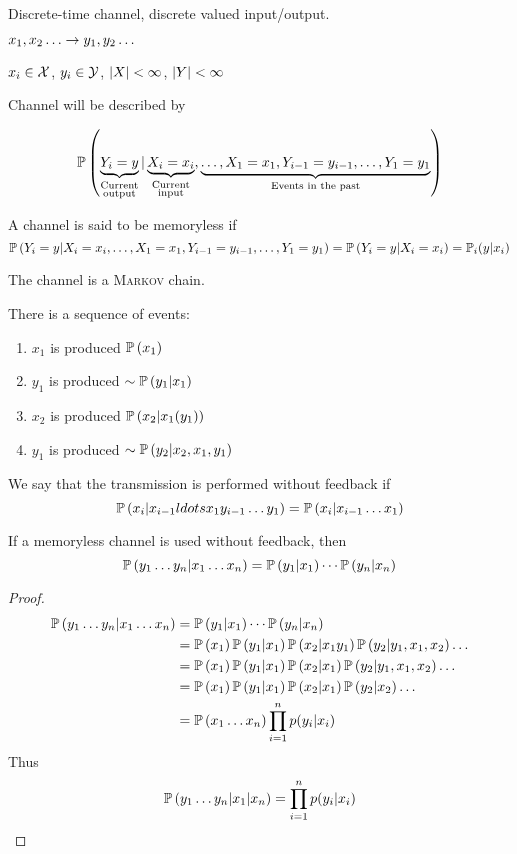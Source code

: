 Discrete-time channel, discrete valued input/output.

$x_1,x_2\ldots \rightarrow y_1, y_2\ldots$

$x_i \in \mathcal{X}$, $y_i \in \mathcal{Y}$, $\left\lvert X\right\rvert < \infty$, $\left\lvert Y\right\rvert < \infty$

Channel will be described by 

\[
    \mathbb{P}\left( \underbrace{Y_i = y}_{\substack{\text{Current}\\\text{output}}} | \underbrace{X_i=x_i}_{\substack{\text{Current}\\\text{input}}}, \underbrace{\ldots, X_1 = x_1,Y_{i-1}=y_{i-1},\ldots, Y_1=y_1}_{\text{Events in the past}} \right)
\]

A channel is said to be memoryless if
\[
    \mathbb{P}\left( Y_i = y | X_i=x_i, \ldots, X_1 = x_1,Y_{i-1}=y_{i-1},\ldots, Y_1=y_1 \right) = \mathbb{P}\left( Y_i = y | X_i=x_i \right) = \mathbb{P}_i(y\vert x_i)
\]

The channel is a \textsc{Markov} chain.

There is a sequence of events:
\begin{enumerate}
    \item $x_1$ is produced $\mathbb{P}\left( x_1 \right)$
    \item $y_1$ is produced $\sim \mathbb{P}\left( y_1 \vert x_1 \right)$
    \item $x_2$ is produced $\mathbb{P}\left( x_2\vert x_1 (y_1) \right)$
    \item $y_1$ is produced $\sim \mathbb{P}\left( y_2 \vert x_2, x_1, y_1 \right)$
\end{enumerate}

We say that the transmission is performed without feedback if
\[
    \mathbb{P}\left( x_i \vert x_{i-1} ldots x_1 y_{i-1}\ldots y_1 \right) = \mathbb{P}\left( x_i \vert x_{i-1}\ldots x_1 \right)
\]

\begin{theorem}
    If a memoryless channel is used without feedback, then
    \[
        \mathbb{P}\left( y_1\ldots y_n\vert x_1\ldots x_n \right) = \mathbb{P}\left( y_1 \vert x_1 \right) \cdots \mathbb{P}\left( y_n \vert x_n \right)
    \]
\end{theorem}
\begin{proof}
    \[
        \begin{aligned}
            \mathbb{P}\left( y_1\ldots y_n\vert x_1\ldots x_n \right) &= \mathbb{P}\left( y_1 \vert x_1 \right) \cdots \mathbb{P}\left( y_n \vert x_n \right)\\
            &= \mathbb{P}\left( x_1 \right) \mathbb{P}\left( y_1\vert x_1 \right) \mathbb{P}\left( x_2\vert x_1 y_1 \right)\mathbb{P}\left( y_2\vert y_1, x_1, x_2 \right) \ldots\\
            &= \mathbb{P}\left( x_1 \right) \mathbb{P}\left( y_1\vert x_1 \right) \mathbb{P}\left( x_2\vert x_1 \right)\mathbb{P}\left( y_2\vert y_1, x_1, x_2 \right) \ldots\\
            &= \mathbb{P}\left( x_1 \right) \mathbb{P}\left( y_1\vert x_1 \right) \mathbb{P}\left( x_2\vert x_1 \right)\mathbb{P}\left( y_2\vert x_2 \right) \ldots\\
            &= \mathbb{P}\left( x_1\ldots x_n \right) \prod\limits_{i=1}^n p(y_i \vert x_i)
        \end{aligned}
    \]
    Thus
    \[
        \mathbb{P}\left( y_1\ldots y_n \vert x_1\vert x_n \right) = \prod\limits_{i=1}^n p(y_i \vert x_i)
    \]
\end{proof}

